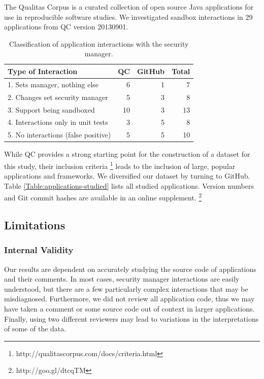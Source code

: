 \documentclass{sig-alternate}
\begin{document}
The Qualitas Corpus is a curated collection of open source Java applications
for use in reproducible software studies. We investigated sandbox
interactions in 29 applications from QC version 20130901.

\begin{table}
\caption{Classification of application interactions with the security manager.}
\label{tab:Classification-of-Application}

\centering{}%
\begin{tabular}{lrrr}
\toprule 
Type of Interaction & QC & GitHub & Total\tabularnewline
\midrule
1. Sets manager, nothing else & 6 & 1 & 7\tabularnewline
2. Changes set security manager & 5 & 3 & 8\tabularnewline
3. Support being sandboxed & 10 & 3 & 13\tabularnewline
4. Interactions only in unit tests & 3 & 5 & 8\tabularnewline
5. No interactions (false positive) & 5 & 5 & 10\tabularnewline
\bottomrule
\end{tabular}
\end{table}


While QC provides a strong starting point for the construction of
a dataset for this study, their inclusion criteria%
\footnote{http://qualitascorpus.com/docs/criteria.html%
} leads to the inclusion of large, popular applications and frameworks.
We diversified our dataset by turning to GitHub. Table \ref{Table:applications-studied}
lists all studied applications. Version numbers and Git commit hashes
are available in an online supplement.%
\footnote{http://goo.gl/dtcqTM%
}

\subsection{Limitations}\label{sub:Limitations-Study}

\subsubsection{Internal Validity}

Our results are dependent on accurately studying the source code of
applications and their comments. In most cases, security manager interactions
are easily understood, but there are a few particularly complex interactions
that may be misdiagnosed. Furthermore, we did not review all application
code, thus we may have taken a comment or some source code out of
context in larger applications. Finally, using two different reviewers
may lead to variations in the interpretations of some of the data. 
\end{document}
